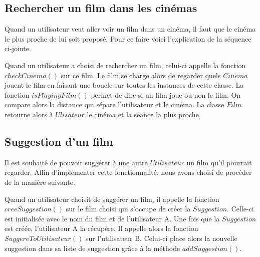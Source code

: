 \documentclass[10pt,a4paper]{article}
\begin{document}
    

    \subsection{Rechercher un film dans les cinémas}

    Quand un utilisateur veut aller voir un film dans un cinéma, il faut que le cinéma le plus proche de lui soit proposé. Pour ce faire voici l'explication de la séquence ci-jointe.

    

    Quand un utilisateur a choisi de rechercher un film, celui-ci appelle la fonction $checkCinema()$ sur ce film. Le film se charge alors de regarder quels $Cinema$ jouent le film en faisant une boucle sur toutes les instances de cette classe. La fonction $isPlayingFilm()$ permet de dire si un film joue ou non le film. On compare alors la distance qui sépare l'utilisateur et le cinéma. La classe $Film$ retourne alors à $Ulisateur$ le cinéma et la séance la plus proche.

    

    \subsection{Suggestion d'un film}

    

    Il est souhaité de pouvoir suggérer à une autre $Utilisateur$ un film qu'il pourrait regarder. Affin d'implémenter cette fonctionnalité, nous avons choisi de procéder de la manière suivante.

    

    Quand un utilisateur choisit de suggérer un film, il appelle la fonction $creeSuggestion()$ sur le film choisi qui s'occupe de créer la $Suggestion$. Celle-ci est initialisée avec le nom du film et de l'utilisateur A. Une fois que la $Suggestion$ est créée, l'utilisateur A la récupère. Il appelle alors la fonction $SuggereToUtilisateur()$ sur l'utilisateur B. Celui-ci place alors la nouvelle suggestion dans sa liste de suggestion grâce à la méthode $addSuggestion()$.

    
\end{document}
